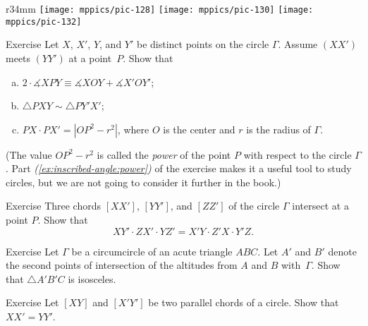 {

\begin{wrapfigure}{r}{34mm}
\centering
\texttt{[image: mppics/pic-128]}
\vskip3mm
\texttt{[image: mppics/pic-130]}
\vskip3mm
\texttt{[image: mppics/pic-132]}
\end{wrapfigure}

\begin{thm}{Exercise}\label{ex:inscribed-angle}
Let $X$, $X'$, $Y$, and $Y'$ be distinct points on the circle $\Gamma$.
Assume $(XX')$ meets $(YY')$ at a point~$P$.
Show that 
\begin{enumerate}[(a)]
\item $2\cdot \measuredangle XPY\equiv\measuredangle XOY+\measuredangle X'OY'$;
\item\label{ex:inscribed-angle:b} $\triangle PXY\sim \triangle PY'X'$;
\item\label{ex:inscribed-angle:power} $PX\cdot PX'=|OP^2-r^2|$, where $O$ is the center and $r$ is the radius of $\Gamma$.
\end{enumerate}

\end{thm}

(The value $OP^2-r^2$ is called the \emph{power} of the point $P$ with respect to the circle $\Gamma$. 
Part \textit{(\ref{ex:inscribed-angle:power})} of the exercise makes it a useful tool to study circles, but we are not going to consider it further in the book.) 

\begin{thm}{Exercise}\label{ex:inscribed-hex}
Three chords $[XX']$, $[YY']$, and $[ZZ']$
of the circle $\Gamma$ intersect at a point $P$.
Show that 
$$XY'\cdot ZX'\cdot YZ'=X'Y\cdot Z'X\cdot Y'Z.$$

\end{thm}

\begin{thm}{Exercise}\label{ex:altitudes-circumcircle}
Let $\Gamma$ be a circumcircle of an acute triangle $A B C$.
Let $A'$ and $B'$ denote the second points of intersection of the altitudes from $A$ and $B$ with~$\Gamma$.
Show that $\triangle A' B' C$ is isosceles.
\end{thm}

\begin{thm}{Exercise}\label{ex:two-chords}
Let $[XY]$ and $[X'Y']$
 be two parallel chords of a circle.
Show that $XX'=YY'$.
\end{thm}

}

